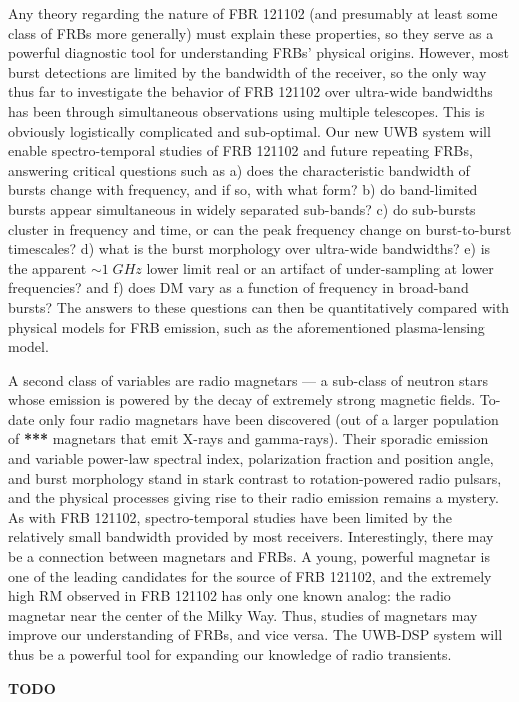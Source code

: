 \documentclass[10pt]{myNSF}
\begin{document}
Any theory regarding the nature of FBR 121102 (and presumably at least
some class of FRBs more generally) must explain these properties, so
they serve as a powerful diagnostic tool for understanding FRBs'
physical origins.  However, most burst detections are limited by the
bandwidth of the receiver, so the only way thus far to investigate the
behavior of FRB 121102 over ultra-wide bandwidths has been through
simultaneous observations using multiple telescopes.  This is
obviously logistically complicated and sub-optimal.  Our new UWB system
will enable spectro-temporal studies of FRB 121102 and future
repeating FRBs, answering critical questions such as a) does the
characteristic bandwidth of bursts change with frequency, and if so,
with what form? b) do band-limited bursts appear simultaneous in
widely separated sub-bands? c) do sub-bursts cluster in frequency and
time, or can the peak frequency change on burst-to-burst timescales?
d) what is the burst morphology over ultra-wide bandwidths? e) is the
apparent $\sim 1\; GHz$ lower limit real or an artifact of
under-sampling at lower frequencies? and f) does DM vary as a function
of frequency in broad-band bursts?  The answers to these questions can
then be quantitatively compared with physical models for FRB emission,
such as the aforementioned plasma-lensing model.

A second class of variables are radio magnetars --- a sub-class of
neutron stars whose emission is powered by the decay of extremely
strong magnetic fields.  To-date only four radio magnetars have been
discovered (out of a larger population of \textbf{***} magnetars that
emit X-rays and gamma-rays).  Their sporadic emission and variable
power-law spectral index, polarization fraction and position angle,
and burst morphology stand in stark contrast to rotation-powered radio
pulsars, and the physical processes giving rise to their radio
emission remains a mystery.  As with FRB 121102, spectro-temporal
studies have been limited by the relatively small bandwidth provided
by most receivers.  Interestingly, there may be a connection between
magnetars and FRBs.  A young, powerful magnetar is one of the leading
candidates for the source of FRB 121102, and the extremely high RM
observed in FRB 121102 has only one known analog: the radio magnetar
near the center of the Milky Way.  Thus, studies of magnetars may
improve our understanding of FRBs, and vice versa.  The UWB-DSP system
will thus be a powerful tool for expanding our knowledge of radio
transients.

 \textbf{TODO}
\end{document}
